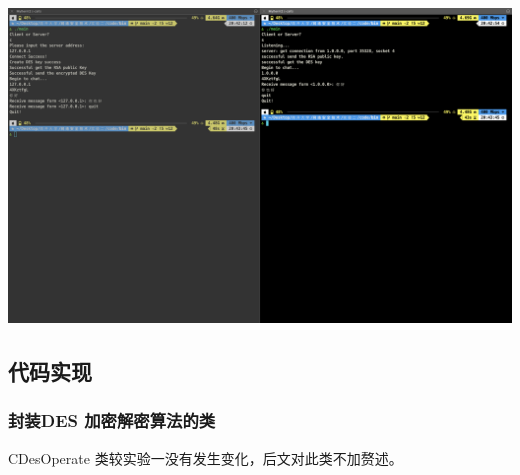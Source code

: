 \documentclass[UTF8,a4paper,10pt]{ctexart}
\begin{document}
\begin{center}
  \includegraphics*[]{4}
\end{center}

\subsection{代码实现}
\subsubsection{封装DES 加密解密算法的类}
CDesOperate 类较实验一没有发生变化，后文对此类不加赘述。
\end{document}
